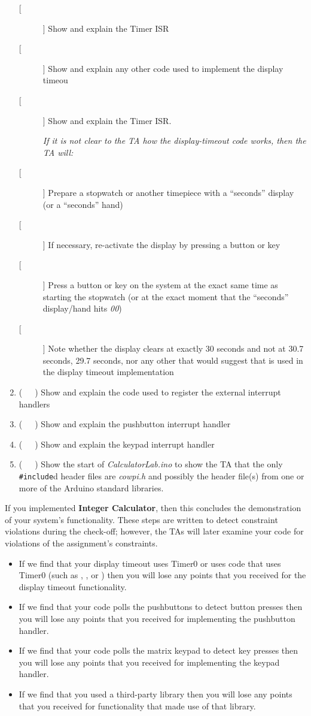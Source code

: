 \begin{enumerate}
\begin{description}
    \item [[ ]] Show and explain the Timer ISR
    \item [[ ]] Show and explain any other code used to implement the display
        timeou
    \item [[ ]] Show and explain the Timer ISR.
    \item [] \textit{If it is not clear to the TA how the display-timeout code
        works, then the TA will:}
    \item [[ ]] Prepare a stopwatch or another timepiece with a ``seconds''
        display (or a ``seconds'' hand)
    \item [[ ]] If necessary, re-activate the display by pressing a button or
        key
    \item [[ ]] Press a button or key on the system at the exact same time as
        starting the stopwatch (or at the exact moment that the ``seconds''
        display/hand hits \textit{00})
    \item [[ ]] Note whether the display clears at exactly 30 seconds and not
        at 30.7 seconds, 29.7 seconds, nor any other that would suggest that
         is used in the display timeout implementation
    \end{description}
\item (\ \ \ ) Show and explain the code used to register the external
    interrupt handlers
\item (\ \ \ ) Show and explain the pushbutton interrupt handler
\item (\ \ \ ) Show and explain the keypad interrupt handler
\item (\ \ \ ) Show the start of \textit{CalculatorLab.ino} to show the TA that the only \lstinline{#include}d header files are \textit{cowpi.h} and possibly the header file(s) from one or more of the Arduino standard libraries.
\end{enumerate}

If you implemented \textbf{Integer Calculator}, then this concludes the
demonstration of your system's functionality. These steps are written to detect
constraint violations during the check-off; however, the TAs will later examine
your code for violations of the assignment's constraints.
\begin{itemize}
\item If we find that your display timeout uses Timer0 or uses code that uses
Timer0 (such as , , or
) then you will lose any points that you received for the
display timeout functionality.
\item If we find that your code polls the pushbuttons to detect button presses
then you will lose any points that you received for implementing the pushbutton
handler.
\item If we find that your code polls the matrix keypad to detect key presses
then you will lose any points that you received for implementing the keypad
handler.
\item If we find that you used a third-party library then you will lose any
points that you received for functionality that made use of that library.
\end{itemize}

